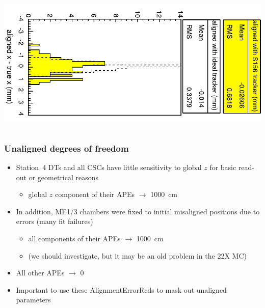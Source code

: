 \documentclass[compress]{beamer}
\begin{document}
\begin{frame}
\begin{columns}
\includegraphics[height=\linewidth, angle=90]{muonalignment_MB1_dep_on_tracker_redrawn.pdf}
\end{columns}
\end{frame}

\begin{frame}
\frametitle{Unaligned degrees of freedom}

\begin{itemize}\setlength{\itemsep}{0.35 cm}
\item Station~4 DTs and all CSCs have little sensitivity to global $z$
  for basic read-out or geometrical reasons
\begin{itemize}
\item global $z$ component of their APEs $\to$ 1000~cm
\end{itemize}

\item In addition, ME1/3 chambers were fixed to initial misaligned
  positions due to errors (many fit failures)

\begin{itemize}
\item all components of their APEs $\to$ 1000~cm
\item (we should investigate, but it may be an old problem in the 22X MC)
\end{itemize}

\item All other APEs $\to$ 0

\item Important to use these AlignmentErrorRcds to mask out unaligned parameters
\end{itemize}
\end{frame}
\end{document}
